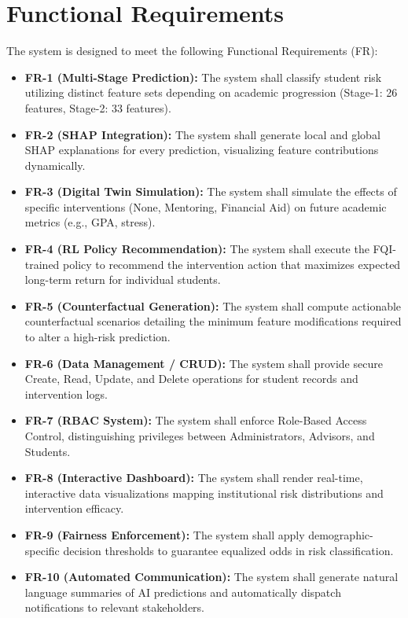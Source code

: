 \documentclass[12pt,a4paper]{report}
\begin{document}
\section{Functional Requirements}
The system is designed to meet the following Functional Requirements (FR):
\begin{itemize}
    \item \textbf{FR-1 (Multi-Stage Prediction):} The system shall classify student risk utilizing distinct feature sets depending on academic progression (Stage-1: 26 features, Stage-2: 33 features).
    \item \textbf{FR-2 (SHAP Integration):} The system shall generate local and global SHAP explanations for every prediction, visualizing feature contributions dynamically.
    \item \textbf{FR-3 (Digital Twin Simulation):} The system shall simulate the effects of specific interventions (None, Mentoring, Financial Aid) on future academic metrics (e.g., GPA, stress).
    \item \textbf{FR-4 (RL Policy Recommendation):} The system shall execute the FQI-trained policy to recommend the intervention action that maximizes expected long-term return for individual students.
    \item \textbf{FR-5 (Counterfactual Generation):} The system shall compute actionable counterfactual scenarios detailing the minimum feature modifications required to alter a high-risk prediction.
    \item \textbf{FR-6 (Data Management / CRUD):} The system shall provide secure Create, Read, Update, and Delete operations for student records and intervention logs.
    \item \textbf{FR-7 (RBAC System):} The system shall enforce Role-Based Access Control, distinguishing privileges between Administrators, Advisors, and Students.
    \item \textbf{FR-8 (Interactive Dashboard):} The system shall render real-time, interactive data visualizations mapping institutional risk distributions and intervention efficacy.
    \item \textbf{FR-9 (Fairness Enforcement):} The system shall apply demographic-specific decision thresholds to guarantee equalized odds in risk classification.
    \item \textbf{FR-10 (Automated Communication):} The system shall generate natural language summaries of AI predictions and automatically dispatch notifications to relevant stakeholders.
\end{itemize}
\end{document}
